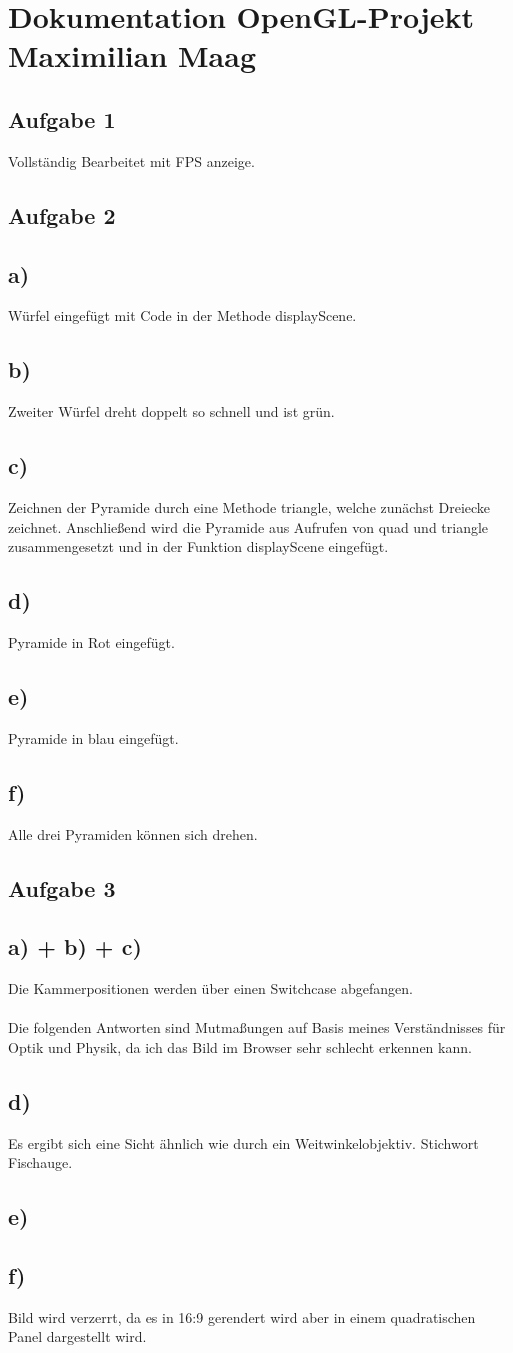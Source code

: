 \documentclass{article}
\begin{document}
	\section*{Dokumentation OpenGL-Projekt Maximilian Maag}
	\subsection*{Aufgabe 1}
	Vollständig Bearbeitet mit FPS anzeige.
	\subsection*{Aufgabe 2}
	\subsection*{a)}
	Würfel eingefügt mit Code in der Methode displayScene.
	\subsection*{b)}
	Zweiter Würfel dreht doppelt so schnell und ist grün.
	\subsection*{c)}
	Zeichnen der Pyramide durch eine Methode triangle, welche zunächst Dreiecke zeichnet. Anschließend wird die Pyramide aus Aufrufen von quad und triangle zusammengesetzt und in der Funktion displayScene eingefügt.
	\subsection*{d)}
	Pyramide in Rot eingefügt.
	\subsection*{e)}
	Pyramide in blau eingefügt.
	\subsection*{f)}
	Alle drei Pyramiden können sich drehen. 
	\subsection*{Aufgabe 3}
	\subsection*{a) + b) + c)}
	Die Kammerpositionen werden über einen Switchcase abgefangen.
	\\ \\
	Die folgenden Antworten sind Mutmaßungen auf Basis meines Verständnisses für Optik und Physik, da ich das Bild im Browser sehr schlecht erkennen kann.
	\subsection*{d)}
	Es ergibt sich eine Sicht ähnlich wie durch ein Weitwinkelobjektiv. Stichwort Fischauge.
	\subsection*{e)}
	\subsection*{f)}
	Bild wird verzerrt, da es in 16:9 gerendert wird aber in einem quadratischen Panel dargestellt wird.
\end{document}
